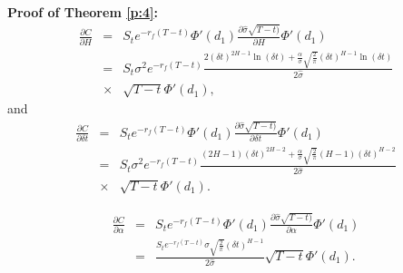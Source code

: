 \documentclass[a4paper,11pt]{amsart}
\numberwithin{equation}{section}
\theoremstyle{definition}
\theoremstyle{plain}
\theoremstyle{definition}
\newcommand{\1}{\mathbf{1}}
\begin{document}
\textbf{Proof of Theorem \ref{p:4}:}\\
\begin{eqnarray}
\frac{\partial C}{\partial H}&=&S_te^{-r_f(T-t)}\Phi'(d_1)\frac{\partial\widehat{\sigma}\sqrt{T-t)}}{\partial H}\Phi'(d_1)\nonumber\\
&=&S_t\sigma^2e^{-r_f(T-t)}\frac{2( \delta t)^{2H-1}\ln (\delta t)+\frac{\alpha}{\sigma}\sqrt{\frac{2}{\pi}}( \delta t)^{H-1}\ln (\delta t)}{2\widehat{\sigma}}\nonumber\\
&\times&\sqrt{T-t}\Phi'(d_1),
\label{eq:52}
\end{eqnarray}
and
\begin{eqnarray}
\frac{\partial C}{\partial \delta t}&=&S_te^{-r_f(T-t)}\Phi'(d_1)\frac{\partial\widehat{\sigma}\sqrt{T-t)}}{\partial \delta t}\Phi'(d_1)\nonumber\\
&=&S_t\sigma^2e^{-r_f(T-t)}\frac{(2H-1)(\delta t)^{2H-2}+\frac{\alpha}{\sigma}\sqrt{\frac{2}{\pi}}(H-1)(\delta t)^{H-2}}{2\widehat{\sigma}}\nonumber\\
&\times&\sqrt{T-t}\Phi'(d_1).
\label{eq:53}
\end{eqnarray}

\begin{eqnarray}
\frac{\partial C}{\partial \alpha}&=&S_te^{-r_f(T-t)}\Phi'(d_1)\frac{\partial\widehat{\sigma}\sqrt{T-t)}}{\partial \alpha}\Phi'(d_1)\nonumber\\
&=&\frac{S_te^{-r_f(T-t)}\sigma\sqrt{\frac{2}{\pi}}(\delta t)^{H-1}}{2\widehat{\sigma}}\sqrt{T-t}\Phi'(d_1).
\label{eq:54}
\end{eqnarray}







\end{document}
